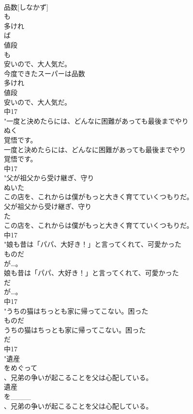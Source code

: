 \documentclass[8pt]{extreport}
\begin{document}
\begin{CJK}{UTF8}{min}
\\	品数[しなかず]
\\	も
\\	多けれ
\\	ば
\\	値段
\\	も
\\	安いので、大人気だ。
\\	今度できたスーパーは品数
\\	多けれ
\\	値段
\\	安いので、大人気だ。
\\	中17
\\	"一度と決めたらには、どんなに困難があっても最後までやり
\\	ぬく
\\	覚悟です。
\\	一度と決めたらには、どんなに困難があっても最後までやり
\\	覚悟です。
\\	中17
\\	"父が祖父から受け継ぎ、守り
\\	ぬいた
\\	この店を、これからは僕がもっと大きく育てていくつもりだ。
\\	父が祖父から受け継ぎ、守り
\\	た
\\	この店を、これからは僕がもっと大きく育てていくつもりだ。
\\	中17
\\	"娘も昔は「パパ、大好き！」と言ってくれて、可愛かった
\\	ものだ
\\	が…。
\\	娘も昔は「パパ、大好き！」と言ってくれて、可愛かった
\\	だ
\\	が…。
\\	中17
\\	"うちの猫はちっとも家に帰ってこない。困った
\\	ものだ
\\	うちの猫はちっとも家に帰ってこない。困った
\\	だ
\\	中17
\\	"遺産
\\	をめぐって
\\	、兄弟の争いが起こることを父は心配している。
\\	遺産
\\	を____
\\	、兄弟の争いが起こることを父は心配している。

\end{CJK}
\end{document}
